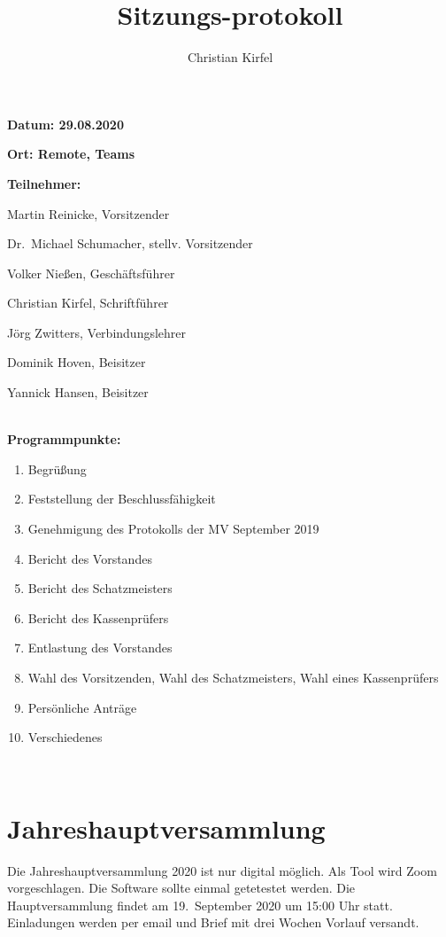 \documentclass[a4paper, 11pt]{article}
\title{Sitzungs-protokoll}
\author{Christian Kirfel}
\begin{document}
\pagestyle{style1}

\textbf{Datum: 29.08.2020} %

\textbf{Ort: Remote, Teams} %

\textbf{Teilnehmer:} %
\begin{description}
\item Martin Reinicke, Vorsitzender
\item Dr.~Michael Schumacher, stellv. Vorsitzender
\item Volker Nießen, Geschäftsführer
\item Christian Kirfel, Schriftführer
\item Jörg Zwitters, Verbindungslehrer
\item Dominik Hoven, Beisitzer
\item Yannick Hansen, Beisitzer
\end{description}

\makebox[\linewidth]{\rule{\linewidth}{0.4pt}}\\
\textbf{Programmpunkte:} 
\begin{enumerate}
\item Begrüßung
\item Feststellung der Beschlussfähigkeit
\item Genehmigung des Protokolls der MV September 2019
\item Bericht des Vorstandes
\item Bericht des Schatzmeisters
\item Bericht des Kassenprüfers
\item Entlastung des Vorstandes
\item Wahl des Vorsitzenden, Wahl des Schatzmeisters, Wahl eines Kassenprüfers
\item Persönliche Anträge
\item Verschiedenes
\end{enumerate}
\makebox[\linewidth]{\rule{\linewidth}{0.4pt}}\\

\newpage

\section*{Jahreshauptversammlung}

Die Jahreshauptversammlung 2020 ist nur digital möglich. Als Tool wird Zoom vorgeschlagen. Die Software sollte einmal getetestet werden.
Die Hauptversammlung findet am 19.~September 2020 um 15:00 Uhr statt.
Einladungen werden per email und Brief mit drei Wochen Vorlauf versandt. 
\end{document}
